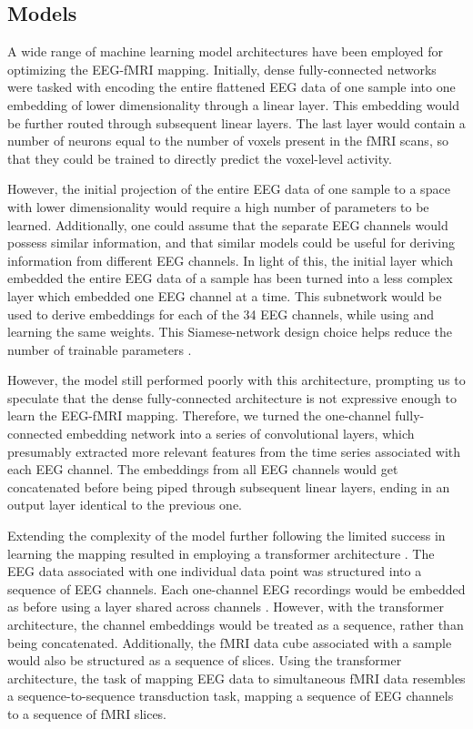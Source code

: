 \documentclass{article}
\begin{document}
\subsection{Models}

A wide range of machine learning model architectures have been employed for optimizing the EEG-fMRI mapping. Initially, dense fully-connected networks were tasked with encoding the entire flattened EEG data of one sample into one embedding of lower dimensionality through a linear layer. This embedding would be further routed through subsequent linear layers. The last layer would contain a number of neurons equal to the number of voxels present in the fMRI scans, so that they could be trained to directly predict the voxel-level activity.

However, the initial projection of the entire EEG data of one sample to a space with lower dimensionality would require a high number of parameters to be learned. Additionally, one could assume that the separate EEG channels would possess similar information, and that similar models could be useful for deriving information from different EEG channels. In light of this, the initial layer which embedded the entire EEG data of a sample has been turned into a less complex layer which embedded one EEG channel at a time. This subnetwork would be used to derive embeddings for each of the 34 EEG channels, while using and learning the same weights. This Siamese-network design choice helps reduce the number of trainable parameters \cite{bromley_signature_nodate}.

However, the model still performed poorly with this architecture, prompting us to speculate that the dense fully-connected architecture is not expressive enough to learn the EEG-fMRI mapping. Therefore, we turned the one-channel fully-connected embedding network into a series of convolutional layers, which presumably extracted more relevant features from the time series associated with each EEG channel. The embeddings from all EEG channels would get concatenated before being piped through subsequent linear layers, ending in an output layer identical to the previous one.

Extending the complexity of the model further following the limited success in learning the mapping resulted in employing a transformer architecture \cite{vaswani_attention_2017}. The EEG data associated with one individual data point was structured into a sequence of EEG channels. Each one-channel EEG recordings would be embedded as before using a layer shared across channels \cite{dosovitskiy_image_2020}. However, with the transformer architecture, the channel embeddings would be treated as a sequence, rather than being concatenated. Additionally, the fMRI data cube associated with a sample would also be structured as a sequence of slices. Using the transformer architecture, the task of mapping EEG data to simultaneous fMRI data resembles a sequence-to-sequence transduction task, mapping a sequence of EEG channels to a sequence of fMRI slices.
\end{document}
